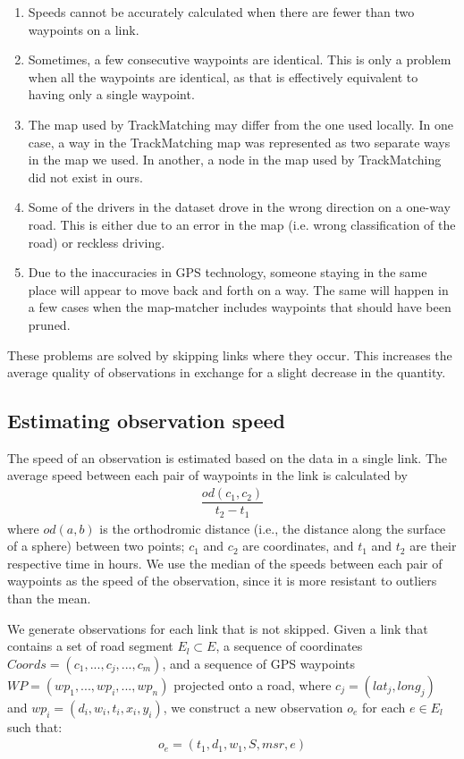 \begin{enumerate}
	\item Speeds cannot be accurately calculated when there are fewer than two waypoints on a link.
	\item Sometimes, a few consecutive waypoints are identical. This is only a problem when all the waypoints are identical, as that is effectively equivalent to having only a single waypoint.
	\item The map used by TrackMatching may differ from the one used locally. In one case, a way in the TrackMatching map was represented as two separate ways in the map we used. In another, a node in the map used by TrackMatching did not exist in ours.
	\item Some of the drivers in the dataset drove in the wrong direction on a one-way road. This is either due to an error in the map (i.e. wrong classification of the road) or reckless driving.
	\item Due to the inaccuracies in GPS technology, someone staying in the same place will appear to move back and forth on a way. The same will happen in a few cases when the map-matcher includes waypoints that should have been pruned.
\end{enumerate}

These problems are solved by skipping links where they occur. This increases the average quality of observations in exchange for a slight decrease in the quantity.

\subsection{Estimating observation speed}\label{KR:speed}
The speed of an observation is estimated based on the data in a single link. The average speed between each pair of waypoints in the link is calculated by
\begin{align*}
\dfrac{od(c_1, c_2)}{t_2 - t_1}
\end{align*}
where $od(a, b)$ is the orthodromic distance (i.e., the distance along the surface of a sphere) between two points; $c_1$ and $c_2$ are coordinates, and $t_1$ and $t_2$ are their respective time in hours. We use the median of the speeds between each pair of waypoints as the speed of the observation, since it is more resistant to outliers than the mean.

We generate observations for each link that is not skipped. Given a link that contains a set of road segment $E_l \subset E$, a sequence of coordinates $Coords = (c_1,...,c_j,...,c_m)$, and a sequence of GPS waypoints $WP=(wp_1,...,wp_i,...,wp_n)$ projected onto a road, where $c_j = (lat_j, long_j)$ and $wp_i = (d_i, w_i, t_i, x_i, y_i)$, we construct a new observation $o_e$ for each $e \in E_l$ such that:
\begin{align*}
o_e = (t_1, d_1, w_1, S, msr, e)
\end{align*}

